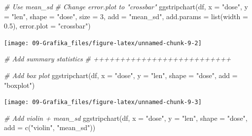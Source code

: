 \documentclass[
]{book}
\newenvironment{Shaded}{\begin{snugshade}}{\end{snugshade}}
\newcommand{\AttributeTok}[1]{\textcolor[rgb]{0.77,0.63,0.00}{#1}}
\newcommand{\CommentTok}[1]{\textcolor[rgb]{0.56,0.35,0.01}{\textit{#1}}}
\newcommand{\DecValTok}[1]{\textcolor[rgb]{0.00,0.00,0.81}{#1}}
\newcommand{\FloatTok}[1]{\textcolor[rgb]{0.00,0.00,0.81}{#1}}
\newcommand{\FunctionTok}[1]{\textcolor[rgb]{0.00,0.00,0.00}{#1}}
\newcommand{\NormalTok}[1]{#1}
\newcommand{\StringTok}[1]{\textcolor[rgb]{0.31,0.60,0.02}{#1}}
\begin{document}
\begin{Shaded}
\begin{Highlighting}[]

\CommentTok{\# Use mean\_sd}
\CommentTok{\# Change error.plot to "crossbar"}
\FunctionTok{ggstripchart}\NormalTok{(df, }\AttributeTok{x =} \StringTok{"dose"}\NormalTok{, }\AttributeTok{y =} \StringTok{"len"}\NormalTok{,}
   \AttributeTok{shape =} \StringTok{"dose"}\NormalTok{, }\AttributeTok{size =} \DecValTok{3}\NormalTok{,}
   \AttributeTok{add =} \StringTok{"mean\_sd"}\NormalTok{, }\AttributeTok{add.params =} \FunctionTok{list}\NormalTok{(}\AttributeTok{width =} \FloatTok{0.5}\NormalTok{),}
   \AttributeTok{error.plot =} \StringTok{"crossbar"}\NormalTok{)}
\end{Highlighting}
\end{Shaded}

\begin{center}\texttt{[image: 09-Grafika\_files/figure-latex/unnamed-chunk-9-2]} \end{center}

\begin{Shaded}
\begin{Highlighting}[]



\CommentTok{\# Add summary statistics}
\CommentTok{\# ++++++++++++++++++++++++++}

\CommentTok{\# Add box plot}
\FunctionTok{ggstripchart}\NormalTok{(df, }\AttributeTok{x =} \StringTok{"dose"}\NormalTok{, }\AttributeTok{y =} \StringTok{"len"}\NormalTok{,}
 \AttributeTok{shape =} \StringTok{"dose"}\NormalTok{, }\AttributeTok{add =} \StringTok{"boxplot"}\NormalTok{)}
\end{Highlighting}
\end{Shaded}

\begin{center}\texttt{[image: 09-Grafika\_files/figure-latex/unnamed-chunk-9-3]} \end{center}

\begin{Shaded}
\begin{Highlighting}[]

\CommentTok{\# Add violin + mean\_sd}
\FunctionTok{ggstripchart}\NormalTok{(df, }\AttributeTok{x =} \StringTok{"dose"}\NormalTok{, }\AttributeTok{y =} \StringTok{"len"}\NormalTok{,}
 \AttributeTok{shape =} \StringTok{"dose"}\NormalTok{, }\AttributeTok{add =} \FunctionTok{c}\NormalTok{(}\StringTok{"violin"}\NormalTok{, }\StringTok{"mean\_sd"}\NormalTok{))}
\end{Highlighting}
\end{Shaded}
\end{document}
